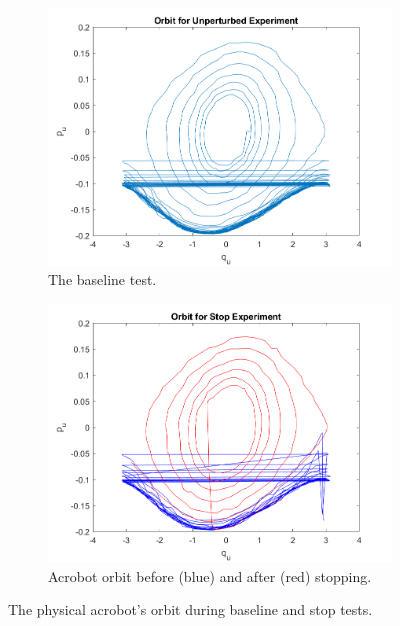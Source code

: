 \documentclass[journal,twoside,web]{ieeecolor}
\begin{document}
\begin{enumerate}
\begin{figure}
    \centering
    \begin{subfigure}[t]{0.45\linewidth}
        \includegraphics[width=\linewidth]{acrobot_unperturbed_orbit.png}
        \caption{The baseline test.}
        \label{fig:acrobot-unperturbed-orbit}
    \end{subfigure}
    \begin{subfigure}[t]{0.45\linewidth}
        \includegraphics[width=\linewidth]{acrobot_stopped_orbit.png}
        \caption{Acrobot orbit before (blue) and after (red) stopping.}
        \label{fig:acrobot-stopped-orbit}
    \end{subfigure}
    \caption{The physical acrobot's orbit during baseline and stop tests.}
\end{figure}


\end{enumerate}
\end{document}
